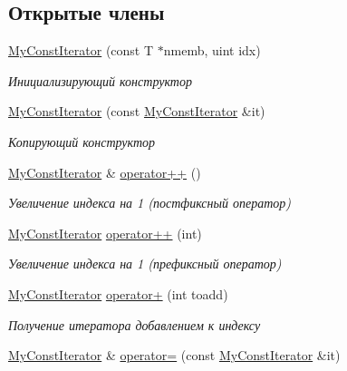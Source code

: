 \subsection*{Открытые члены}
\begin{DoxyCompactItemize}
\item 
\hyperlink{class_network_service_1_1_my_const_iterator_a7e183160817f8b9dadf9d4a857d9ccaf}{My\+Const\+Iterator} (const T $\ast$nmemb, uint idx)
\begin{DoxyCompactList}\small\item\em Инициализирующий конструктор \end{DoxyCompactList}\item 
\hyperlink{class_network_service_1_1_my_const_iterator_a2af24e77940dce68ffeac3dc5d502755}{My\+Const\+Iterator} (const \hyperlink{class_network_service_1_1_my_const_iterator}{My\+Const\+Iterator} \&it)
\begin{DoxyCompactList}\small\item\em Копирующий конструктор \end{DoxyCompactList}\item 
\hyperlink{class_network_service_1_1_my_const_iterator}{My\+Const\+Iterator} \& \hyperlink{class_network_service_1_1_my_const_iterator_ab4f583f1037994c6cb7c8900d08aad75}{operator++} ()
\begin{DoxyCompactList}\small\item\em Увеличение индекса на 1 (постфиксный оператор) \end{DoxyCompactList}\item 
\hyperlink{class_network_service_1_1_my_const_iterator}{My\+Const\+Iterator} \hyperlink{class_network_service_1_1_my_const_iterator_ae5f5bac3cb72a1dd8e94e162b38d0cdd}{operator++} (int)
\begin{DoxyCompactList}\small\item\em Увеличение индекса на 1 (префиксный оператор) \end{DoxyCompactList}\item 
\hyperlink{class_network_service_1_1_my_const_iterator}{My\+Const\+Iterator} \hyperlink{class_network_service_1_1_my_const_iterator_a0c18a1dd9c0b66ed30f0a81046ffd7c1}{operator+} (int toadd)
\begin{DoxyCompactList}\small\item\em Получение итератора добавлением к индексу \end{DoxyCompactList}\item 
\hyperlink{class_network_service_1_1_my_const_iterator}{My\+Const\+Iterator} \& \hyperlink{class_network_service_1_1_my_const_iterator_a53aad52b888c357044143021be3f3de4}{operator=} (const \hyperlink{class_network_service_1_1_my_const_iterator}{My\+Const\+Iterator} \&it)

\end{DoxyCompactItemize}
